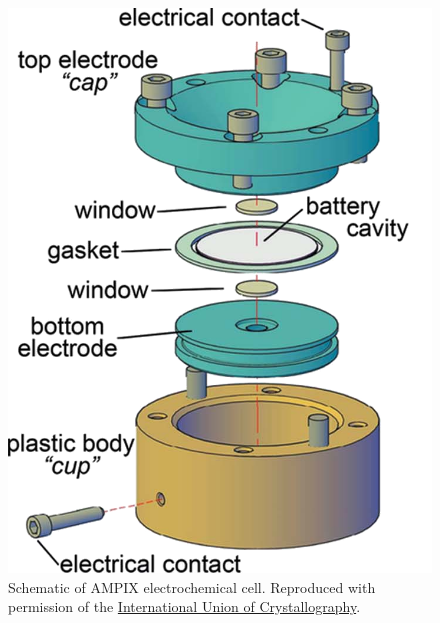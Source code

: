 \documentclass[journal=cmatex,manuscript=perspective]{achemso}
\newcommand{\iucr}{Reproduced with permission of the
  \href{http://journals.iucr.org/}{International Union of
    Crystallography}.}
\begin{document}
\begin{figure}
  \includegraphics[width=\textwidth]{ampix.png}
  \caption{Schematic of AMPIX electrochemical cell.\cite{borkiewicz2012} \iucr}
  \label{figure:ampix}
\end{figure}
\end{document}
